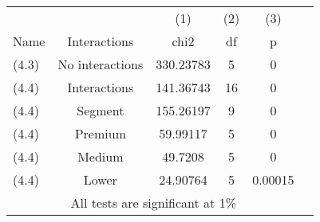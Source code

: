 
\begin{tabular}{lccccc} \hline
	&& (1) & (2) & (3)\\
	Name&Interactions&chi2&df&p&\\
(4.3)&No interactions&330.23783&5&0\\
(4.4)&Interactions&141.36743&16&0\\
(4.4)&Segment&155.26197&9&0\\
(4.4)&Premium&59.99117&5&0\\
(4.4)&Medium&49.7208&5&0\\
(4.4)&Lower&24.90764&5&0.00015\\
	\hline
	\multicolumn{5}{c}{All tests are significant at 1\%} \\
\end{tabular}

